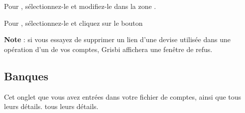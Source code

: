 Pour , sélectionnez-le et modifiez-le dans la zone .

Pour , sélectionnez-le et cliquez sur le bouton 

\textbf{Note} : si vous essayez de supprimer un lien d'une devise utilisée dans une opération d'un de vos comptes, Grisbi affichera une fenêtre de refus.


\subsection{Banques\label{setup-resources-banks}}

Cet onglet  que vous avez entrées dans votre fichier de comptes, ainsi que
\ifIllustration tous leurs détails.
\else tous leurs détails.
\fi

